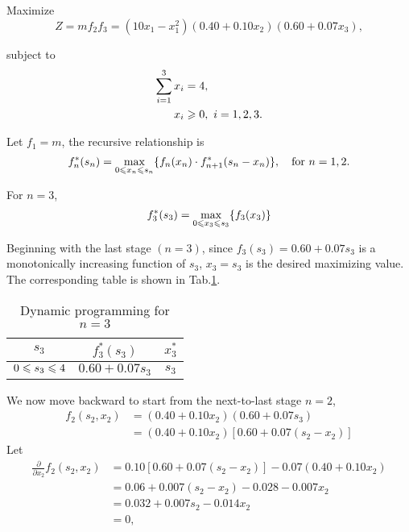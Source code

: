 \documentclass[a4paper]{article}
\begin{document}
\begin{enumerate}
\begin{solution}
	Maximize $$Z=mf_2f_3=(10x_1-x_1^2)(0.40+0.10x_2)(0.60+0.07x_3),$$
	
	subject to
	\begin{equation*}
		\begin{aligned}
			\sum_{i=1}^3x_i&=4,\\		
			x_i&\geqslant0,\ i=1,2,3.
		\end{aligned}
	\end{equation*}
	
	Let $f_1=m$, the recursive relationship is
	\begin{equation*}	
		f_n^*(s_n)=\max\limits_{0\leqslant x_n\leqslant s_n}\{f_n(x_n) \cdot f_{n+1}^*(s_n-x_n)\},
		\quad \text{for } n=1,2.
	\end{equation*}
	
	For $n=3$,
	\begin{equation*}
		f_3^*(s_3)=\max\limits_{0\leqslant x_3\leqslant s_3}\{f_3(x_3)\}
	\end{equation*}
	
	Beginning with the last stage $(n=3)$, since $f_3(s_3)=0.60+0.07s_3$ is a monotonically increasing function of $s_3$, $x_3=s_3$ is the desired maximizing value. The corresponding table is shown in Tab.\ref{tab2n3}.
	\begin{table}[h]
	  	\centering
	  	\caption{Dynamic programming for $n=3$}
	  	\label{tab2n3}
	  	\begin{tabular}{ccc}
	  		\toprule[1.5pt]
	  		$s_3$&$f_3^*(s_3)$&$x_3^*$\\
	  		\midrule
			$0\leqslant s_3\leqslant4$&$0.60+0.07s_3$&$s_3$\\
	  		\bottomrule[1.5pt]
	  	\end{tabular}
  	\end{table}
  	
	We now move backward to start from the next-to-last stage $n=2$,
	\begin{equation*}
	\begin{aligned}
		f_2(s_2,x_2)&=(0.40+0.10x_2)(0.60+0.07s_3)\\
					    &=(0.40+0.10x_2)[0.60+0.07(s_2-x_2)]
		\end{aligned}
	\end{equation*}
	Let
	\begin{equation*}
	\begin{aligned}
		\frac{\partial}{\partial x_2}f_2(s_2,x_2)
		&=0.10[0.60+0.07(s_2-x_2)]-0.07(0.40+0.10x_2)\\
		&=0.06+0.007(s_2-x_2)-0.028-0.007x_2\\
		&=0.032+0.007s_2-0.014x_2\\
		&=0,\\
		\end{aligned}
	\end{equation*}
	

\end{solution}
\end{enumerate}
\end{document}
